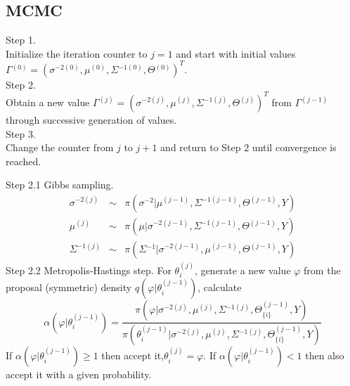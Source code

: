 \documentclass[9pt]{beamer}
\begin{document}
\subsection{MCMC}
\begin{frame}{}
Step 1. \\
Initialize the iteration counter to $j=1$ and start with initial values $\Gamma{}^{(0)}=(\sigma{}^{-2(0)},\mu{}^{(0)},\Sigma{}^{-1(0)},\Theta{}^{(0)})^{T}$. \\
Step 2. \\
Obtain a new value  $\Gamma{}^{(j)}=(\sigma{}^{-2(j)},\mu{}^{(j)},\Sigma{}^{-1(j)},\Theta{}^{(j)})^{T}$ from $\Gamma{}^{(j-1)}$ through successive generation of values. \\
Step 3. \\
Change the counter from $j$ to $j+1$ and return to Step 2 until convergence is reached.
\end{frame}

\begin{frame}{}
Step 2.1 Gibbs sampling.
\begin{equation}
\begin{array}{rcl}
\sigma{}^{-2(j)} & \sim{} & \pi{}(\sigma^{-2}|\mu{}^{(j-1)},\Sigma{}^{-1(j-1)},\Theta{}^{(j-1)},Y) \\
\mu{}^{(j)} & \sim{} & \pi{}(\mu{}|\sigma{}^{-2(j-1)},\Sigma{}^{-1(j-1)},\Theta{}^{(j-1)},Y) \\
\Sigma{}^{-1(j)} & \sim{} & \pi{}(\Sigma{}^{-1}|\sigma{}^{-2(j-1)},\mu{}^{(j-1)},\Theta{}^{(j-1)},Y)
\end{array}
\end{equation}
Step 2.2 Metropolis-Hastings step.
For $\theta{}_{i}^{(j)}$, generate a new value $\varphi$ from the proposal (symmetric) density $q(\varphi{}|\theta{}_{i}^{(j-1)})$, calculate
\begin{equation}
\alpha{}(\varphi{}|\theta{}_{i}^{(j-1)})=\frac{\pi{}(\varphi{}|\sigma{}^{-2(j)},\mu{}^{(j)},\Sigma{}^{-1(j)},\Theta{}_{\{i\}}^{(j-1)},Y)}{\pi{}(\theta{}_{i}^{(j-1)}|\sigma{}^{-2(j)},\mu{}^{(j)},\Sigma{}^{-1(j)},\Theta{}_{\{i\}}^{(j-1)},Y)}
\end{equation}
If $\alpha{}(\varphi{}|\theta{}_{i}^{(j-1)})\ge{}1$ then accept it,$\theta{}_{i}^{(j)}=\varphi{}$. If $\alpha{}(\varphi{}|\theta{}_{i}^{(j-1)})<1$ then also accept it with a given probability.
\end{frame}
\end{document}
